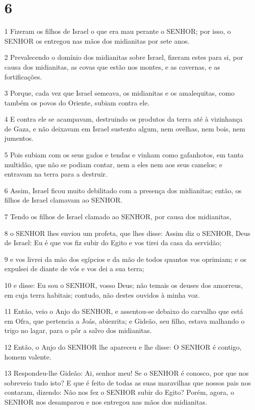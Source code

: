 \chapter{6}

\par 1 Fizeram os filhos de Israel o que era mau perante o SENHOR; por isso, o SENHOR os entregou nas mãos dos midianitas por sete anos.
\par 2 Prevalecendo o domínio dos midianitas sobre Israel, fizeram estes para si, por causa dos midianitas, as covas que estão nos montes, e as cavernas, e as fortificações.
\par 3 Porque, cada vez que Israel semeava, os midianitas e os amalequitas, como também os povos do Oriente, subiam contra ele.
\par 4 E contra ele se acampavam, destruindo os produtos da terra até à vizinhança de Gaza, e não deixavam em Israel sustento algum, nem ovelhas, nem bois, nem jumentos.
\par 5 Pois subiam com os seus gados e tendas e vinham como gafanhotos, em tanta multidão, que não se podiam contar, nem a eles nem aos seus camelos; e entravam na terra para a destruir.
\par 6 Assim, Israel ficou muito debilitado com a presença dos midianitas; então, os filhos de Israel clamavam ao SENHOR.
\par 7 Tendo os filhos de Israel clamado ao SENHOR, por causa dos midianitas,
\par 8 o SENHOR lhes enviou um profeta, que lhes disse: Assim diz o SENHOR, Deus de Israel: Eu é que vos fiz subir do Egito e vos tirei da casa da servidão;
\par 9 e vos livrei da mão dos egípcios e da mão de todos quantos vos oprimiam; e os expulsei de diante de vós e vos dei a sua terra;
\par 10 e disse: Eu sou o SENHOR, vosso Deus; não temais os deuses dos amorreus, em cuja terra habitais; contudo, não destes ouvidos à minha voz.
\par 11 Então, veio o Anjo do SENHOR, e assentou-se debaixo do carvalho que está em Ofra, que pertencia a Joás, abiezrita; e Gideão, seu filho, estava malhando o trigo no lagar, para o pôr a salvo dos midianitas.
\par 12 Então, o Anjo do SENHOR lhe apareceu e lhe disse: O SENHOR é contigo, homem valente.
\par 13 Respondeu-lhe Gideão: Ai, senhor meu! Se o SENHOR é conosco, por que nos sobreveio tudo isto? E que é feito de todas as suas maravilhas que nossos pais nos contaram, dizendo: Não nos fez o SENHOR subir do Egito? Porém, agora, o SENHOR nos desamparou e nos entregou nas mãos dos midianitas.
